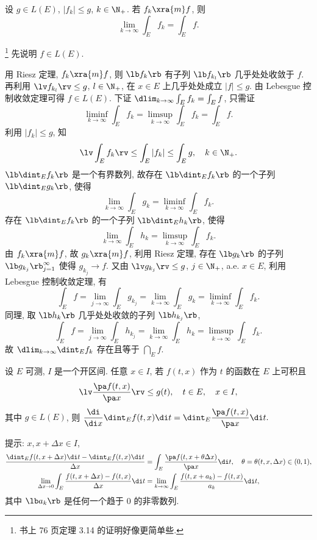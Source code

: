 \documentclass[UTF8, a4paper, 12pt, twoside, onecolumn]{book}
\begin{document}
\begin{Theorem}
	设 $g \in L(E)$, $|f_k| \leq g$, $k \in \N_+$. 若 $f_k \xra{m} f$, 则
$$\lim_{k \to \infty} \int_E f_k = \int_E f.$$
\end{Theorem}

\begin{Proof}\footnote{书上 76 页定理 3.14 的证明好像更简单些.}
	先说明 $f \in L(E)$.

	用 Riesz 定理, $f_k \xra{m} f$, 则 $\lb f_k \rb$ 有子列 $\lb f_{k_l} \rb$ 几乎处处收敛于 $f$. 再利用 $\lv f_{k_l}\rv \leq g$, $l \in \N_+$, 在 $x \in E$ 上几乎处处成立 $|f| \leq g$. 由 Lebesgue 控制收敛定理可得 $f \in L(E)$. 下证 $\dlim_{k \to \infty} \int_E f_k = \int_E f$, 只需证
	$$\liminf_{k \to \infty} \int_E f_k = \limsup_{k \to \infty} \int_E f_k = \int_E f.$$
	利用 $|f_k| \leq g$, 知
	$$\lv \int_E f_k \rv \leq \int_E |f_k| \leq \int_E g,\quad k \in \N_+.$$
	$\lb \dint_E f_k \rb$ 是一个有界数列, 故存在 $\lb \dint_E f_k \rb$ 的一个子列 $\lb \dint_E g_k \rb$, 使得
	$$\lim_{k \to \infty} \int_E g_k = \liminf_{k \to \infty} \int_E f_k.$$
	存在 $\lb \dint_E f_k \rb$ 的一个子列 $\lb \dint_E h_k \rb$, 使得
	$$\lim_{k \to \infty} \int_E h_k = \limsup_{k \to \infty} \int_E f_k.$$
	由 $f_k \xra{m} f$, 故 $g_k \xra{m} f$, 利用 Riesz 定理, 存在 $\lb g_k \rb$ 的子列 $\lb g_{k_j} \rb_{j = 1}^\infty$ 使得 $g_{k_j} \to f$. 又由 $\lv g_{k_j} \rv \leq g$, $j \in \N_+$, a.e. $x \in E$, 利用 Lebesgue 控制收敛定理, 有
	$$\int_E f = \lim_{j \to \infty} \int_E g_{k_j} = \lim_{k \to \infty} \int_E g_k = \liminf_{k \to \infty} \int_E f_k.$$
	同理, 取 $\lb h_k \rb$ 几乎处处收敛的子列 $\lb h_{k_j} \rb$,
	$$\int_E f = \lim_{j \to \infty} \int_E h_{k_j} = \lim_{k \to \infty} \int_E h_k = \limsup_{k \to \infty} \int_E f_k.$$
	故 $\dlim_{k \to \infty} \dint_E f_k$ 存在且等于 $\dint_E f$.
\end{Proof}

\begin{Theorem}[可微性]
设 $E$ 可测, $I$ 是一个开区间. 任意 $x \in I$, 若 $f(t, x)$ 作为 $t$ 的函数在 $E$ 上可积且
	$$\lv \dfrac{\pa f(t, x)}{\pa x} \rv \leq g(t),\quad t \in E,\quad x \in I,$$
其中 $g \in L(E)$, 则 $\dfrac{\di}{\di x} \dint_E f(t, x) \di t = \dint_E \dfrac{\pa f(t, x)}{\pa x} \di t.$
\end{Theorem}

\begin{Proof}
	提示: $x, x + \Delta x \in I$,
	\begin{align*}
		\frac{\dint_E f(t, x + \Delta x) \di t - \dint_E f(t, x) \di t}{\Delta x} &= \int_E \frac{\pa f(t, x + \theta \Delta x)}{\pa x} \di t,\quad \theta = \theta(t, x, \Delta x) \in (0, 1),\\
	\lim_{\Delta x \to 0} \int_E \frac{f(t, x + \Delta x) - f(t, x)}{\Delta x} \di t &= \lim_{k \to \infty} \int_E \frac{f(t, x + a_k) - f(t, x)}{a_k} \di t,
	\end{align*}
	其中 $\lb a_k \rb$ 是任何一个趋于 0 的非零数列.
\end{Proof}
\end{document}
